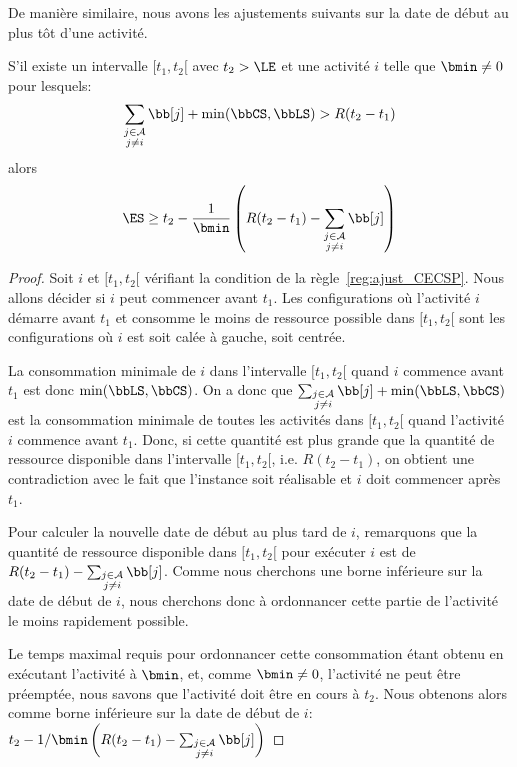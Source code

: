 De manière similaire, nous avons les ajustements suivants sur la date
de début au plus tôt d'une activité. 
\begin{reg}
\label{ajustRi_CECSP}
S'il existe un intervalle $[t_1,t_2[$ avec $ t_2 > \LE$ et une
activité $i$ telle que $\bmin \neq 0$ pour lesquels:
  \[ \sum_{\substack{j \in \A \\ j \neq i}} \bb[j] +
    \min(\bbCS,\bbLS) > R (t_2-t_1)\] 
  alors
  \[ \ES \ge t_2 - \frac{1}{\bmin} \left(R (t_2-t_1) -\sum_{\substack{j
\in \A \\ j \neq i}} \bb[j] \right) \]
\end{reg}

\begin{proof}
Soit $i$ et $[t_1,t_2[$ vérifiant la condition de la
règle~\ref{reg:ajust_CECSP}. Nous allons décider si $i$ peut commencer
avant $t_1$. Les configurations où l'activité $i$ démarre avant $t_1$
et consomme le moins de ressource possible dans $[t_1,t_2[$ sont les
configurations où $i$ est soit calée à gauche, soit centrée.

La consommation minimale de $i$ dans l'intervalle $[t_1,t_2[$ quand
$i$ commence avant $t_1$ est donc $\min( \bbLS, \bbCS)$. On a donc que
$\sum_{\substack{j \in \A\\ j\neq i}} \bb[j] + \min( \bbLS, \bbCS) $
est la consommation minimale de toutes les activités dans $[t_1,t_2[$
quand l'activité $i$ commence avant $t_1$. Donc, si cette quantité est
plus grande que la quantité de ressource disponible dans l'intervalle
$[t_1,t_2[$, i.e. $R(t_2-t_1)$, on obtient une contradiction avec le
fait que l'instance soit réalisable et $i$ doit commencer après $t_1$.

Pour calculer la nouvelle date de début au plus tard de $i$,
remarquons que la quantité de ressource disponible dans $[t_1,t_2[$
pour exécuter $i$ est de $R(t_2-t_1) -\sum_{\substack{j \in \A\\
j\neq i}} \bb[j]$. Comme nous cherchons une borne inférieure sur la date de
début de $i$, nous cherchons donc à ordonnancer cette partie de
l'activité le moins rapidement possible. 

Le temps maximal requis pour ordonnancer cette consommation étant
obtenu en exécutant l'activité à $\bmin$, et, comme $\bmin \neq 0$,
l'activité ne peut être préemptée, nous savons que l'activité doit
être en cours à $t_2$. Nous obtenons alors comme borne inférieure sur
la date de début de $i$:
$t_2 - 1/\bmin \left(R (t_2-t_1) -\sum_{\substack{j
\in \A \\ j \neq i}} \bb[j] \right) $
\end{proof}

